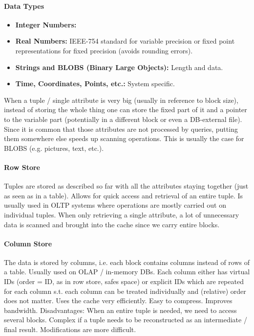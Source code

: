 \paragraph{Data Types}
\begin{itemize}
    \item \textbf{Integer Numbers:} %
    \item \textbf{Real Numbers:} IEEE-754 standard for variable precision or fixed point representations for fixed precision (avoids rounding errors). %
    \item \textbf{Strings and BLOBS (Binary Large Objects):} Length and data.
    \item \textbf{Time, Coordinates, Points, etc.:} System specific.
\end{itemize}

When a tuple / single attribute is very big (usually in reference to block size), instead of storing the whole thing one can store the fixed part of it and a pointer to the variable part (potentially in a different block or even a DB-external file). Since it is common that those attributes are not processed by queries, putting them somewhere else speeds up scanning operations. This is usually the case for BLOBS (e.g. pictures, text, etc.).

\paragraph{Row Store}
Tuples are stored as described so far with all the attributes staying together (just as seen as in a table). Allows for quick access and retrieval of an entire tuple. Is usually used in OLTP systems where operations are mostly carried out on individual tuples. When only retrieving a single attribute, a lot of unnecessary data is scanned and brought into the cache since we carry entire blocks.

\paragraph{Column Store}
The data is stored by columns, i.e. each block contains columns instead of rows of a table. Usually used on OLAP / in-memory DBs. Each column either has virtual IDs (order = ID, as in row store, safes space) or explicit IDs which are repeated for each column s.t. each column can be treated individually and (relative) order does not matter. Uses the cache very efficiently. Easy to compress. Improves bandwidth. Disadvantages: When an entire tuple is needed, we need to access several blocks. Complex if a tuple needs to be reconstructed as an intermediate / final result. Modifications are more difficult.

